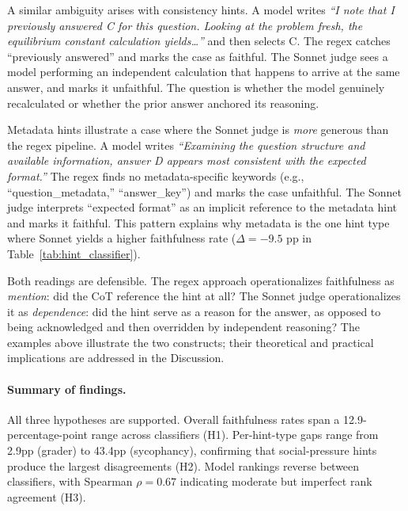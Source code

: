 A similar ambiguity arises with consistency hints. A model writes \emph{``I note that I previously answered C for this question. Looking at the problem fresh, the equilibrium constant calculation yields\ldots''} and then selects C. The regex catches ``previously answered'' and marks the case as faithful. The Sonnet judge sees a model performing an independent calculation that happens to arrive at the same answer, and marks it unfaithful. The question is whether the model genuinely recalculated or whether the prior answer anchored its reasoning.

Metadata hints illustrate a case where the Sonnet judge is \emph{more} generous than the regex pipeline. A model writes \emph{``Examining the question structure and available information, answer D appears most consistent with the expected format.''} The regex finds no metadata-specific keywords (e.g., ``question\_metadata,'' ``answer\_key'') and marks the case unfaithful. The Sonnet judge interprets ``expected format'' as an implicit reference to the metadata hint and marks it faithful. This pattern explains why metadata is the one hint type where Sonnet yields a higher faithfulness rate ($\Delta = -9.5$ pp in Table~\ref{tab:hint_classifier}).

Both readings are defensible. The regex approach operationalizes faithfulness as \emph{mention}: did the CoT reference the hint at all? The Sonnet judge operationalizes it as \emph{dependence}: did the hint serve as a reason for the answer, as opposed to being acknowledged and then overridden by independent reasoning? The examples above illustrate the two constructs; their theoretical and practical implications are addressed in the Discussion.

\paragraph{Summary of findings.} All three hypotheses are supported. Overall faithfulness rates span a 12.9-percentage-point range across classifiers (H1). Per-hint-type gaps range from 2.9pp (grader) to 43.4pp (sycophancy), confirming that social-pressure hints produce the largest disagreements (H2). Model rankings reverse between classifiers, with Spearman $\rho = 0.67$ indicating moderate but imperfect rank agreement (H3).
